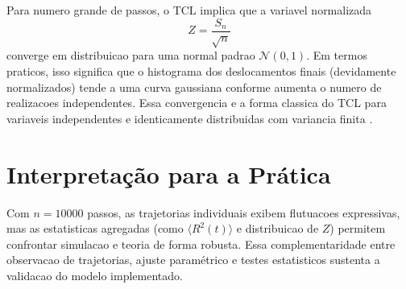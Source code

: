 Para numero grande de passos, o TCL implica que a variavel normalizada
\begin{equation}
Z = \frac{S_n}{\sqrt{n}}
\end{equation}
converge em distribuicao para uma normal padrao $\mathcal{N}(0,1)$. Em termos praticos, isso significa que o histograma dos deslocamentos finais (devidamente normalizados) tende a uma curva gaussiana conforme aumenta o numero de realizacoes independentes.
Essa convergencia e a forma classica do TCL para variaveis independentes e identicamente distribuidas com variancia finita \cite{mathworld_central_limit_theorem}.

\section{Interpretação para a Prática}

Com $n=10000$ passos, as trajetorias individuais exibem flutuacoes expressivas, mas as estatisticas agregadas (como $\langle R^2(t)\rangle$ e distribuicao de $Z$) permitem confrontar simulacao e teoria de forma robusta. Essa complementaridade entre observacao de trajetorias, ajuste paramétrico e testes estatisticos sustenta a validacao do modelo implementado.


